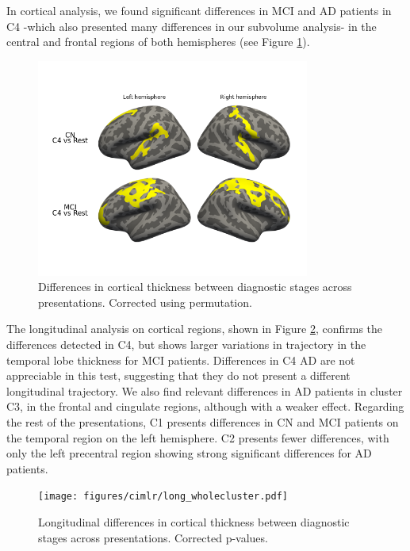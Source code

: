 In cortical analysis, we found significant differences in MCI and AD patients in C4 -which also presented many differences in our subvolume analysis- in the central and frontal regions of both hemispheres (see Figure \ref{dxcluster_againstrest_cort}). \\

\begin{figure}[!htbp]
\centering
\includegraphics[width=0.8\textwidth]{figures/cimlr/ex4_cort.png}
\caption[Diagnostic interaction analysis, cortical thickness.]{Differences in cortical thickness between diagnostic stages across presentations. Corrected using permutation.}
\label{dxcluster_againstrest_cort}
\end{figure}

The longitudinal analysis on cortical regions, shown in Figure \ref{long_diagnostic_interaction}, confirms the differences detected in C4, but shows larger variations in trajectory in the temporal lobe thickness for MCI patients. Differences in C4 AD are not appreciable in this test, suggesting that they do not present a different longitudinal trajectory. We also find relevant differences in AD patients in cluster C3, in the frontal and cingulate regions, although with a weaker effect. Regarding the rest of the presentations, C1 presents differences in CN and MCI patients on the temporal region on the left hemisphere. C2 presents fewer differences, with only the left precentral region showing strong significant differences for AD patients.

\begin{figure}[!htbp]
\centering
\texttt{[image: figures/cimlr/long\_wholecluster.pdf]}
\caption[Longitudinal diagnostic interaction analysis, cortical thickness.]{Longitudinal differences in cortical thickness between diagnostic stages across presentations. Corrected p-values.}
\label{long_diagnostic_interaction}
\end{figure}

